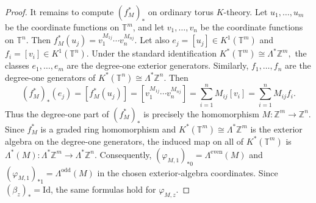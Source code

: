 \documentclass[11pt]{amsart}
\theoremstyle{definition}
\theoremstyle{remark}
\newcommand{\T}{\mathbb{T}}
\newcommand{\Z}{\mathbb{Z}}
\newcommand{\id}{\mathrm{Id}}
\begin{document}
\begin{proof}
It remains to compute $(f_M^*)_*$ on ordinary torus $K$-theory. Let
$u_1,\ldots,u_m$ be the coordinate functions on $\T^m$, and let
$v_1,\ldots,v_n$ be the coordinate functions on $\T^n$. Then $f_M^*(u_j)
=
v_1^{M_{1j}}\cdots v_n^{M_{nj}}.$
Let also $e_j=[u_j]\in K^1(\T^m)$ and $f_i=[v_i]\in K^1(\T^n).$
Under the standard identification $K^*(\T^m)\cong \Lambda^*\Z^m,$
the classes $e_1,\ldots,e_m$ are the degree-one exterior generators. Similarly,
$f_1,\ldots,f_n$ are the degree-one generators of $K^*(\T^n)\cong \Lambda^*\Z^n.$ Then
\[(f_M^*)_*(e_j)=
[f_M^*(u_j)]=
[v_1^{M_{1j}}\cdots v_n^{M_{nj}}]
=
\sum_{i=1}^n M_{ij}[v_i]=
\sum_{i=1}^n M_{ij}f_i.
\]
Thus the degree-one part of $(f_M^*)_*$ is precisely the homomorphism $M\colon \Z^m\to\Z^n.$
Since \(f_M^*\) is a graded ring homomorphism and $K^*(\T^m)\cong \Lambda^*\Z^m$
is the exterior algebra on the degree-one generators, the induced map on all
of $K^*(\T^m)$ is $\Lambda^*(M)\colon \Lambda^*\Z^m\to\Lambda^*\Z^n.$
Consequently,
$(\varphi_{M,1})_{*0}=\Lambda^{\mathrm{even}}(M)$ and
$(\varphi_{M,1})_{*1}=\Lambda^{\mathrm{odd}}(M)$
in the chosen exterior-algebra coordinates. Since $(\beta_z)_*=\id$, the same formulas hold for $\varphi_{M,z}$.
\end{proof}
\end{document}

